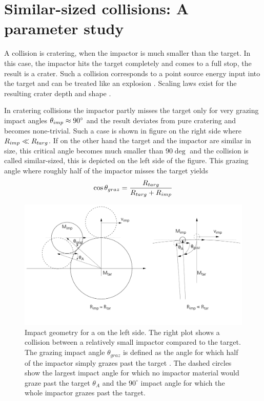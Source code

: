 \newpage
\chapter{Similar-sized collisions: A parameter study}
\graphicspath{{./03figs/}}

A collision is cratering, when the impactor is much smaller than the target. In this case, the impactor hits the target completely and comes to a full stop, the result is a crater. Such a collision corresponds to a point source energy input into the target and can be treated like an explosion \citep{Melosh:2007p3502}. Scaling laws exist for the resulting crater depth and shape \citep{Holsapple:1993p3018}. 

In cratering collisions  the impactor partly misses the target only for very grazing impact angles $\theta_{imp} \approx 90 ^\circ$ and the result deviates from pure cratering and becomes none-trivial. Such a case is shown in figure \label{ch03_fig03} on the right side where $R_{imp} \ll R_{targ}$. If on the other hand the target and the impactor are similar in size, this critical angle becomes much smaller than $90 \deg$ and the collision is called similar-sized, this is depicted on the left side of the figure. This grazing angle where roughly half of the impactor misses the target yields
\begin{equation}
\label{ch03_eq001}
\cos{ \theta_{graz} }= \frac{R_{targ}}{R_{targ} + R_{imp}}
\end{equation}



\begin{figure}[htbp]
\begin{center}
\includegraphics[scale=0.4]{03_grazing}
\caption{Impact geometry for a \SSC on the left side. The right plot shows a collision between a relatively small impactor compared to the target. The grazing impact angle $\theta_{graz}$ is defined as the angle for which half of the impactor simply grazes past the target \citep{Asphaug:2010p3539}. The dashed circles show the largest impact angle for which no impactor material would graze past the target $\theta_A$ and the $90^\circ$ impact angle for which the whole impactor grazes past the target.}
\label{ch03_fig03}
\end{center}
\end{figure}

